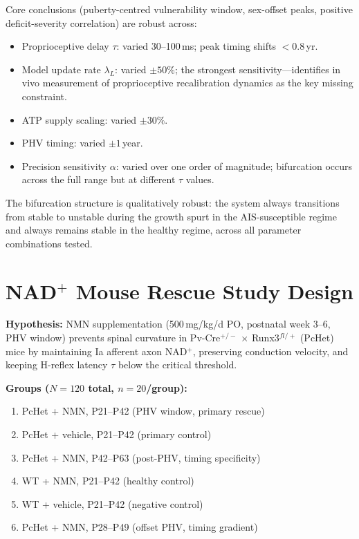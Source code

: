 \documentclass[12pt, letterpaper]{article}
\begin{document}
Core conclusions (puberty-centred vulnerability window, sex-offset peaks,
positive deficit-severity correlation) are robust across:

\begin{itemize}
  \item Proprioceptive delay $\tau$: varied 30--100\,ms;
    peak timing shifts $<0.8$\,yr.
  \item Model update rate $\lambda_L$: varied $\pm 50\%$;
    the strongest sensitivity---identifies in vivo measurement of proprioceptive
    recalibration dynamics as the key missing constraint.
  \item ATP supply scaling: varied $\pm 30\%$.
  \item PHV timing: varied $\pm 1$\,year.
  \item Precision sensitivity $\alpha$: varied over one order of magnitude;
    bifurcation occurs across the full range but at different $\tau$ values.
\end{itemize}

The bifurcation structure is qualitatively robust: the system always transitions
from stable to unstable during the growth spurt in the AIS-susceptible regime and
always remains stable in the healthy regime, across all parameter combinations
tested.

\section{NAD$^{+}$ Mouse Rescue Study Design}
\label{app:nad_study}

\textbf{Hypothesis:} NMN supplementation (500\,mg/kg/d PO, postnatal week 3--6,
PHV window) prevents spinal curvature in Pv-Cre$^{+/-}$ $\times$ Runx3$^{fl/+}$
(PcHet) mice by maintaining Ia afferent axon NAD$^{+}$, preserving conduction
velocity, and keeping H-reflex latency $\tau$ below the critical threshold.

\textbf{Groups ($N = 120$ total, $n = 20$/group):}
\begin{enumerate}
  \item PcHet + NMN, P21--P42 (PHV window, primary rescue)
  \item PcHet + vehicle, P21--P42 (primary control)
  \item PcHet + NMN, P42--P63 (post-PHV, timing specificity)
  \item WT + NMN, P21--P42 (healthy control)
  \item WT + vehicle, P21--P42 (negative control)
  \item PcHet + NMN, P28--P49 (offset PHV, timing gradient)
\end{enumerate}
\end{document}

